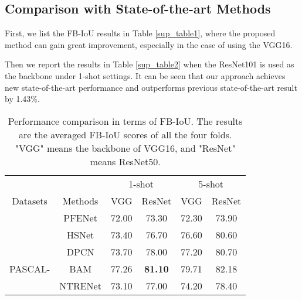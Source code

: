 \documentclass[10pt,twocolumn,letterpaper]{article}
\begin{document}
\subsection{Comparison with State-of-the-art Methods}
First, we list the FB-IoU results in Table \ref{sup_table1}, where the proposed method can gain great improvement, especially in the case of using the VGG16.\par Then we report the results in Table \ref{sup_table2} when the ResNet101 is used as the backbone under 1-shot settings. It can be seen that our approach achieves new state-of-the-art performance and outperforms previous state-of-the-art result by 1.43\%.
\begin{table}[htbp]
	\centering
	\renewcommand\tabcolsep{2pt}
	\caption{Performance comparison in terms of FB-IoU. The results are the averaged FB-IoU scores of all the four folds. "VGG" means the backbone of VGG16, and "ResNet" means ResNet50.}
	\begin{tabular}{c|c|cc|cc}
		\hline
		&                                & \multicolumn{2}{c|}{1-shot}                                                     & \multicolumn{2}{c}{5-shot}                                                      \\ \cline{3-6} 
		\multirow{-2}{*}{Datasets} & \multirow{-2}{*}{Methods}      & VGG                                  & ResNet                               & VGG                                  & ResNet                               \\ \hline
		& PFENet\cite{pfenet}                         & 72.00                                  & 73.30                                  & 72.30                                  & 73.90                                  \\
		& HSNet\cite{hsnet}                          & 73.40                                  & 76.70                                  & 76.60                                  & 80.60                                  \\
		& DPCN\cite{dpcn}                          & 73.70                                  & 78.00                                  & 77.20                                  & 80.70                                  \\
		PASCAL-                     & BAM\cite{bam}                            & 77.26                                  & \textbf{81.10}                         & 79.71                                  & 82.18                                  \\
		& NTRENet\cite{ntre}                        & 73.10                                  & 77.00                                  & 74.20                                  & 78.40                                  \\ \cline{2-6} 

\end{tabular}
\end{table}
\end{document}
